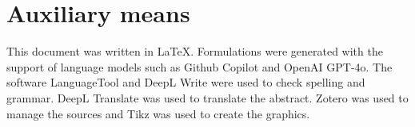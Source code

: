 
\section*{Auxiliary means}\label{sec: auxiliary means}
This document was written in \LaTeX{}. Formulations were generated with the support of language models such as Github Copilot and OpenAI GPT-4o. The software LanguageTool and DeepL Write were used to check spelling and grammar. DeepL Translate was used to translate the abstract. Zotero was used to manage the sources and Tikz was used to create the graphics.